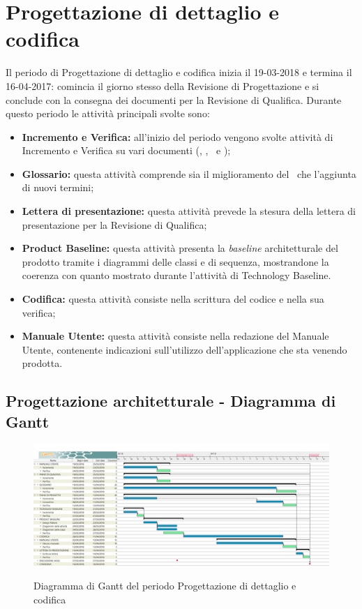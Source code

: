 \documentclass[PianoDiProgetto.tex]{subfiles}
\begin{document}
\section{Progettazione di dettaglio e codifica}
Il periodo di Progettazione di dettaglio e codifica inizia il 19-03-2018 e
termina il 16-04-2017: comincia il giorno stesso della Revisione di Progettazione e si conclude con la consegna dei documenti per la Revisione di
Qualifica. Durante questo periodo le attività principali svolte sono:


\begin{itemize}
	\item \textbf{Incremento e Verifica:} all'inizio del periodo vengono svolte attività di Incremento e Verifica su vari documenti (\normediprogetto, \pianodiprogetto, \pianodiqualifica\ e \technology);
	\item \textbf{Glossario:} questa attività comprende sia il miglioramento del \glossario\ che l'aggiunta di nuovi termini;
	\item \textbf{Lettera di presentazione:} questa attività prevede la stesura della lettera di presentazione per la Revisione di Qualifica;
	\item \textbf{Product Baseline:} questa attività presenta la \textit{baseline} architetturale del prodotto tramite i  diagrammi delle classi e di sequenza,
	mostrandone la coerenza con quanto mostrato durante l'attività di Technology Baseline. 
	\item \textbf{Codifica:} questa attività consiste nella scrittura del codice e nella sua verifica;
	\item \textbf{Manuale Utente:} questa attività consiste nella redazione del Manuale Utente, contenente indicazioni sull’utilizzo dell'applicazione che sta venendo prodotta.
\end{itemize}

\begin{landscape}
	\subsection{Progettazione architetturale - Diagramma di Gantt}
	\begin{figure}[ht]
		\includegraphics[width=21cm]{images/gantt/qualifica.png}
		\label{fig:foo}
		\caption{Diagramma di Gantt del periodo Progettazione di dettaglio e
			codifica}
	\end{figure}	
\end{landscape}
\end{document}
